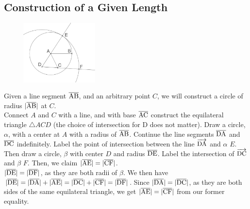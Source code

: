 \documentclass{report}
\begin{document}
\subsection{Construction of a Given Length}
\label{sec:FAV}
\begin{figure} %
    \centering
    \includegraphics[width=0.35\textwidth]{fav}
\end{figure}
Given a line segment $\overline{\rm AB}$, and an arbitrary point $C$, we will construct a circle of radius $|\overline{\rm AB}|$ at $C$.
\\[\baselineskip]
Connect $A$ and $C$ with a line, and with base $\overline{\rm AC}$ construct the equilateral triangle $\triangle{ACD}$ (the choice of intersection for D does not matter). Draw a circle, $\alpha$, with a center at $A$ with a radius of $\overline{\rm AB}$. Continue the line segments $\overline{\rm DA}$ and $\overline{\rm DC}$ indefinitely. Label the point of intersection between the line $\overrightarrow{\rm DA}$ and $\alpha$ $E$. Then draw a circle, $\beta$ with center $D$ and radius $\overline{\rm DE}$. Label the intersection of $\overrightarrow{\rm DC}$ and $\beta$ $F$. Then, we claim $|\overline{\rm AE}| = |\overline{\rm CF}|$.
\\$|\overline{\rm DE}|=|\overline{\rm DF}|$, as they are both radii of $\beta$. We then have $|\overline{\rm DE}|=|\overline{\rm DA}|+|\overline{\rm AE}|=|\overline{\rm DC}|+|\overline{\rm CF}|=|\overline{\rm DF}|$. Since $|\overline{\rm DA}|=|\overline{\rm DC}|$, as they are both sides of the same equilateral triangle, we get $|\overline{\rm AE}| = |\overline{\rm CF}|$ from our former equality.
\end{document}
